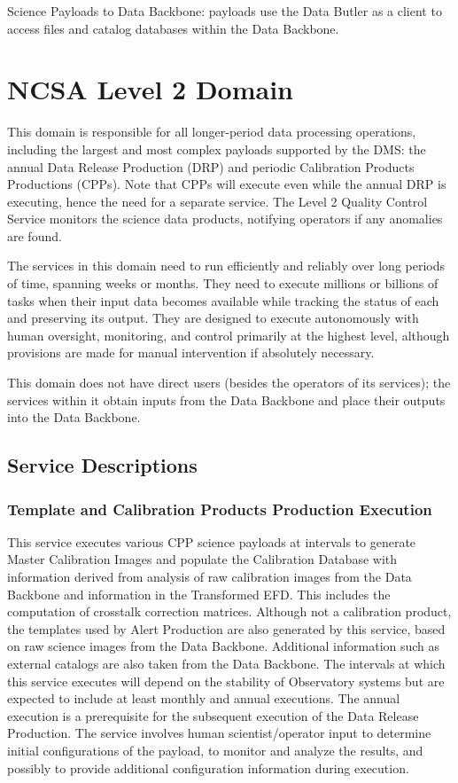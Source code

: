 \documentclass[DM,toc]{lsstdoc}
\begin{document}
Science Payloads to Data Backbone: payloads use the Data Butler as a
client to access files and catalog databases within the Data Backbone.

\section{NCSA Level 2 Domain}\label{ncsa-level-2-domain}

This domain is responsible for all longer-period data processing
operations, including the largest and most complex payloads supported by
the DMS: the annual Data Release Production (DRP) and periodic
Calibration Products Productions (CPPs). Note that CPPs will execute
even while the annual DRP is executing, hence the need for a separate
service. The Level 2 Quality Control Service monitors the science data
products, notifying operators if any anomalies are found.

The services in this domain need to run efficiently and reliably over
long periods of time, spanning weeks or months. They need to execute
millions or billions of tasks when their input data becomes available
while tracking the status of each and preserving its output. They are
designed to execute autonomously with human oversight, monitoring, and
control primarily at the highest level, although provisions are made for
manual intervention if absolutely necessary.

This domain does not have direct users (besides the operators of its
services); the services within it obtain inputs from the Data Backbone
and place their outputs into the Data Backbone.

\subsection{Service Descriptions}\label{ncsa-l2-service-descriptions}

\subsubsection{Template and Calibration Products Production
Execution}\label{template-and-calibration-products-production-execution}

This service executes various CPP science payloads at intervals to
generate Master Calibration Images and populate the Calibration Database
with information derived from analysis of raw calibration images from
the Data Backbone and information in the Transformed EFD. This includes
the computation of crosstalk correction matrices. Although not a
calibration product, the templates used by Alert Production are also
generated by this service, based on raw science images from the Data
Backbone. Additional information such as external catalogs are also
taken from the Data Backbone. The intervals at which this service
executes will depend on the stability of Observatory systems but are
expected to include at least monthly and annual executions. The annual
execution is a prerequisite for the subsequent execution of the Data
Release Production. The service involves human scientist/operator input
to determine initial configurations of the payload, to monitor and
analyze the results, and possibly to provide additional configuration
information during execution.
\end{document}
